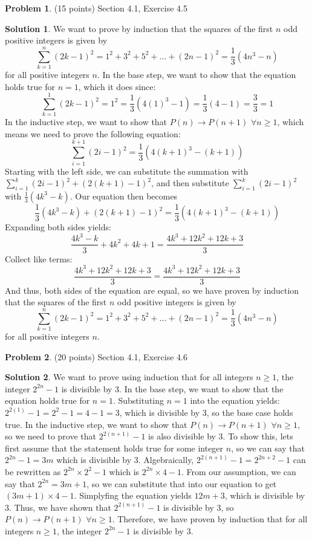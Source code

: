 \documentclass{article}
\theoremstyle{definition}
\newtheorem{problem}{Problem}
\newtheorem*{solution}{Solution}
\begin{document}
\newpage
\begin{problem} (15 points) Section 4.1, Exercise 4.5 
\end{problem}
\begin{solution}
We want to prove by induction that the squares of the first $n$ odd positive integers is given by \[\sum_{k=1}^{n} (2k-1)^2 = 1^2 + 3^2 +5^2 + ... + (2n-1)^2 = \frac{1}{3} (4n^3 - n)\] for all positive integers $n$.
In the base step, we want to show that the equation holds true for $n=1$, which it does since: \[\sum_{k=1}^{1} (2k-1)^2 = 1^2 = \frac{1}{3} (4(1)^3 - 1) = \frac{1}{3} (4 - 1) = \frac{3}{3} = 1\]
In the inductive step, we want to show that $P(n) \rightarrow P(n+1)$ $\forall n \ge 1$, which means we need to prove the following equation: \[\sum_{i=1}^{k+1} (2i-1)^2 = \frac{1}{3} (4(k+1)^3 - (k+1))\]
Starting with the left side, we can substitute the summation with $\sum_{i=1}^{k} (2i-1)^2 + (2(k+1)-1)^2$, and then substitute $\sum_{i=1}^{k} (2i-1)^2$ with $\frac{1}{3} (4k^3 - k)$.
Our equation then becomes \[\frac{1}{3} (4k^3 - k) + (2(k+1)-1)^2 = \frac{1}{3} (4(k+1)^3 - (k+1))\]
Expanding both sides yields: \[\frac{4k^3 - k}{3} + 4k^2 + 4k + 1 = \frac{4k^3 + 12k^2 + 12k + 3}{3}\]
Collect like terms: \[\frac{4k^3 + 12k^2 + 12k + 3}{3} = \frac{4k^3 + 12k^2 + 12k + 3}{3}\]
And thus, both sides of the equation are equal, so we have proven by induction that the squares of the first $n$ odd positive integers is given by \[\sum_{k=1}^{n} (2k-1)^2 = 1^2 + 3^2 +5^2 + ... + (2n-1)^2 = \frac{1}{3} (4n^3 - n)\] for all positive integers $n$.
\end{solution}

\newpage
\begin{problem} (20 points) Section 4.1, Exercise 4.6 
\end{problem}
\begin{solution} 
We want to prove using induction that for all integers $n\ge1$, the integer $2^{2n}-1$ is divisible by 3.
In the base step, we want to show that the equation holds true for $n=1$.
Substituting $n=1$ into the equation yields: $2^{2(1)}-1 = 2^2-1 = 4-1 = 3$, which is divisible by 3, so the base case holds true.
In the inductive step, we want to show that $P(n) \rightarrow P(n+1)$ $\forall n \ge 1$, so we need to prove that $2^{2(n+1)}-1$ is also divisible by 3.
To show this, lets first assume that the statement holds true for some integer $n$, so we can say that $2^{2n}-1 = 3m$ which is divisible by 3.
Algebraically, $2^{2(n+1)}-1 = 2^{2n+2}-1$ can be rewritten as $2^{2n} \times 2^2 - 1$ which is $2^{2n} \times 4 - 1$.
From our assumption, we can say that $2^{2n}=3m+1$, so we can substitute that into our equation to get $(3m+1) \times 4 - 1$.
Simplyfing the equation yields $12m+3$, which is divisible by 3.
Thus, we have shown that $2^{2(n+1)}-1$ is divisible by 3, so $P(n) \rightarrow P(n+1)$ $\forall n \ge 1$.
Therefore, we have proven by induction that for all integers $n\ge1$, the integer $2^{2n}-1$ is divisible by 3.
\end{solution}
\end{document}
